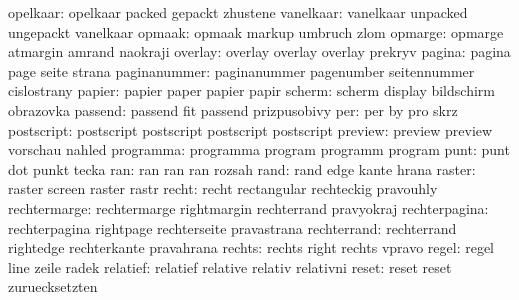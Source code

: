            opelkaar:  opelkaar             packed              gepackt
                      zhustene
          vanelkaar:  vanelkaar            unpacked            ungepackt
                      vanelkaar %
             opmaak:  opmaak               markup              umbruch
                      zlom
            opmarge:  opmarge              atmargin            amrand
                      naokraji
            overlay:  overlay              overlay             overlay
                      prekryv
             pagina:  pagina               page                seite
                      strana
       paginanummer:  paginanummer         pagenumber          seitennummer
                      cislostrany
             papier:  papier               paper               papier
                      papir
             scherm:  scherm               display             bildschirm
                      obrazovka
            passend:  passend              fit                 passend
                      prizpusobivy
                per:  per                  by                  pro
                      skrz
         postscript:  postscript           postscript          postscript
                      postscript
            preview:  preview              preview             vorschau
                      nahled
          programma:  programma            program             programm
                      program
               punt:  punt                 dot                 punkt
                      tecka
                ran:  ran                  ran                 ran
                      rozsah
               rand:  rand                 edge                kante
                      hrana
             raster:  raster               screen              raster
                      rastr
              recht:  recht                rectangular         rechteckig
                      pravouhly
       rechtermarge:  rechtermarge         rightmargin         rechterrand
                      pravyokraj
      rechterpagina:  rechterpagina        rightpage           rechterseite
                      pravastrana
        rechterrand:  rechterrand          rightedge           rechterkante
                      pravahrana
             rechts:  rechts               right               rechts
                      vpravo
              regel:  regel                line                zeile
                      radek
           relatief:  relatief             relative            relativ
                      relativni
              reset:  reset                reset               zuruecksetzten
